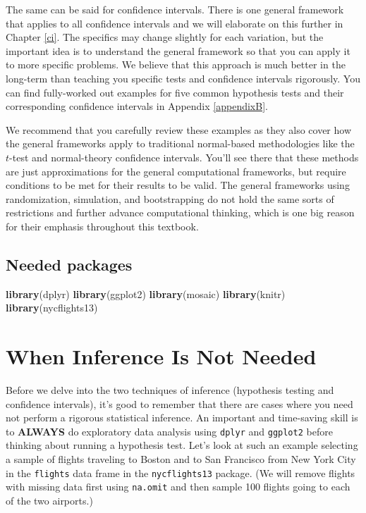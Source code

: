 \documentclass[]{tufte-book}
\newenvironment{Shaded}{\begin{snugshade}}{\end{snugshade}}
\newcommand{\KeywordTok}[1]{\textcolor[rgb]{0.13,0.29,0.53}{\textbf{{#1}}}}
\newcommand{\NormalTok}[1]{{#1}}
\begin{document}
The same can be said for confidence intervals. There is one general
framework that applies to all confidence intervals and we will elaborate
on this further in Chapter \ref{ci}. The specifics may change slightly
for each variation, but the important idea is to understand the general
framework so that you can apply it to more specific problems. We believe
that this approach is much better in the long-term than teaching you
specific tests and confidence intervals rigorously. You can find
fully-worked out examples for five common hypothesis tests and their
corresponding confidence intervals in Appendix \ref{appendixB}.

We recommend that you carefully review these examples as they also cover
how the general frameworks apply to traditional normal-based
methodologies like the \(t\)-test and normal-theory confidence
intervals. You'll see there that these methods are just approximations
for the general computational frameworks, but require conditions to be
met for their results to be valid. The general frameworks using
randomization, simulation, and bootstrapping do not hold the same sorts
of restrictions and further advance computational thinking, which is one
big reason for their emphasis throughout this textbook.

\subsection*{Needed packages}\label{needed-packages-4}

\begin{Shaded}
\begin{Highlighting}[]
\KeywordTok{library}\NormalTok{(dplyr)}
\KeywordTok{library}\NormalTok{(ggplot2)}
\KeywordTok{library}\NormalTok{(mosaic)}
\KeywordTok{library}\NormalTok{(knitr)}
\KeywordTok{library}\NormalTok{(nycflights13)}
\end{Highlighting}
\end{Shaded}

\section{When Inference Is Not
Needed}\label{when-inference-is-not-needed}

Before we delve into the two techniques of inference (hypothesis testing
and confidence intervals), it's good to remember that there are cases
where you need not perform a rigorous statistical inference. An
important and time-saving skill is to \textbf{ALWAYS} do exploratory
data analysis using \texttt{dplyr} and \texttt{ggplot2} before thinking
about running a hypothesis test. Let's look at such an example selecting
a sample of flights traveling to Boston and to San Francisco from New
York City in the \texttt{flights} data frame in the
\texttt{nycflights13} package. (We will remove flights with missing data
first using \texttt{na.omit} and then sample 100 flights going to each
of the two airports.)
\end{document}
